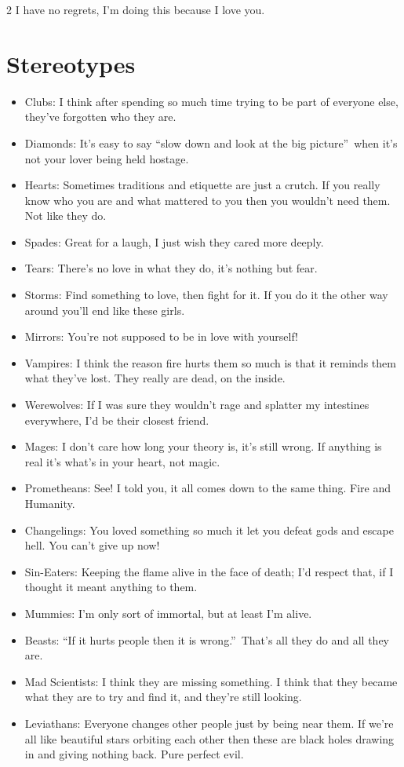 \begin{multicols}{2}
I have no regrets, I'm doing this because I love you.

\section*{Stereotypes}

\begin{itemize}
\item Clubs: I think after spending so much time trying to be part of everyone else, they've forgotten who they are.
\item Diamonds: It's easy to say \textquotedblleft slow down and look at the big picture\textquotedblright\, when it's not your lover being held hostage.
\item Hearts: Sometimes traditions and etiquette are just a crutch. If you really know who you are and what mattered to you then you wouldn't need them. Not like they do.
\item Spades: Great for a laugh, I just wish they cared more deeply.
\item Tears: There's no love in what they do, it's nothing but fear.
\item Storms: Find something to love, then fight for it. If you do it the other way around you'll end like these girls. 
\item Mirrors: You're not supposed to be in love with yourself!

\item Vampires: I think the reason fire hurts them so much is that it reminds them what they've lost. They really are dead, on the inside.
\item Werewolves: If I was sure they wouldn't rage and splatter my intestines everywhere, I'd be their closest friend.
\item Mages: I don't care how long your theory is, it's still wrong. If anything is real it's what's in your heart, not magic.
\item Prometheans: See! I told you, it all comes down to the same thing. Fire and Humanity.
\item Changelings: You loved something so much it let you defeat gods and escape hell. You can't give up now!
\item Sin-Eaters: Keeping the flame alive in the face of death; I'd respect that, if I thought it meant anything to them.
\item Mummies: I'm only sort of immortal, but at least I'm alive. 
\item Beasts: \textquotedblleft If it hurts people then it is wrong.\textquotedblright\, That's all they do and all they are.
\item Mad Scientists: I think they are missing something. I think that they became what they are to try and find it, and they're still looking.
\item Leviathans: Everyone changes other people just by being near them. If we're all like beautiful stars orbiting each other then these are black holes drawing in and giving nothing back. Pure perfect evil.


\end{itemize}
\end{multicols}
